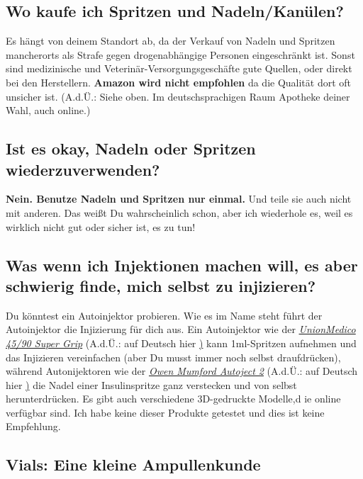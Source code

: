 \documentclass{article}
\begin{document}
{\subsection{Wo kaufe ich Spritzen und Nadeln/Kanülen?}

Es hängt von deinem Standort ab, da der Verkauf von Nadeln und Spritzen mancherorts als Strafe gegen drogenabhängige Personen eingeschränkt ist. Sonst sind medizinische und Veterinär-Versorgungsgeschäfte gute Quellen, oder direkt bei den Herstellern. \textbf{Amazon wird nicht empfohlen} da die Qualität dort oft unsicher ist. (A.d.Ü.: Siehe oben. Im deutschsprachigen Raum Apotheke deiner Wahl, auch online.)

\subsection{Ist es okay, Nadeln oder Spritzen wiederzuverwenden?}

\textbf{Nein. Benutze Nadeln und Spritzen nur einmal. }Und teile sie auch nicht mit anderen. Das weißt Du wahrscheinlich schon, aber ich wiederhole es, weil es wirklich nicht gut oder sicher ist, es zu tun!

\subsection{Was wenn ich Injektionen machen will, es aber schwierig finde, mich selbst zu injizieren?}\label{5-21}

Du könntest ein Autoinjektor probieren. Wie es im Name steht führt der Autoinjektor die Injizierung für dich aus. Ein Autoinjektor wie der \href{https://unionmedico.com/90-super-grip/}{\textit{UnionMedico 45/90 Super Grip}} (A.d.Ü.: auf Deutsch hier \href{https://www.b12-injektion.de/}) kann 1ml-Spritzen aufnehmen und das Injizieren vereinfachen (aber Du musst immer noch selbst draufdrücken), während Autonijektoren wie der \href{https://www.owenmumford.com/us/medical-devices/autoject-2}{\textit{Owen Mumford Autoject 2}} (A.d.Ü.: auf Deutsch hier \href{https://shop.owen-mumford.de/Sonstiges/Autoinjektor-Autoject-2-mit-austauschbarer-Nadel.html}) die Nadel einer Insulinspritze ganz verstecken und von selbst herunterdrücken. Es gibt auch verschiedene 3D-gedruckte Modelle,d ie online verfügbar sind. Ich habe keine dieser Produkte getestet und dies ist keine Empfehlung.

\subsection*{Vials: Eine kleine Ampullenkunde}

}
\end{document}
